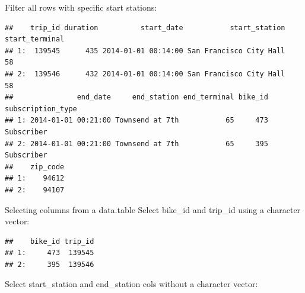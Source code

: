 \documentclass[]{book}
\newenvironment{Shaded}{\begin{snugshade}}{\end{snugshade}}
\newcommand{\DecValTok}[1]{\textcolor[rgb]{0.00,0.00,0.81}{#1}}
\newcommand{\KeywordTok}[1]{\textcolor[rgb]{0.13,0.29,0.53}{\textbf{#1}}}
\newcommand{\NormalTok}[1]{#1}
\newcommand{\OperatorTok}[1]{\textcolor[rgb]{0.81,0.36,0.00}{\textbf{#1}}}
\newcommand{\StringTok}[1]{\textcolor[rgb]{0.31,0.60,0.02}{#1}}
\begin{document}
Filter all rows with specific start stations:

\begin{Shaded}
\end{Shaded}

\begin{verbatim}
##    trip_id duration          start_date           start_station start_terminal
## 1:  139545      435 2014-01-01 00:14:00 San Francisco City Hall             58
## 2:  139546      432 2014-01-01 00:14:00 San Francisco City Hall             58
##               end_date     end_station end_terminal bike_id subscription_type
## 1: 2014-01-01 00:21:00 Townsend at 7th           65     473        Subscriber
## 2: 2014-01-01 00:21:00 Townsend at 7th           65     395        Subscriber
##    zip_code
## 1:    94612
## 2:    94107
\end{verbatim}

Selecting columns from a data.table
Select bike\_id and trip\_id using a character vector:

\begin{Shaded}
\end{Shaded}

\begin{verbatim}
##    bike_id trip_id
## 1:     473  139545
## 2:     395  139546
\end{verbatim}

Select start\_station and end\_station cols without a character vector:

\begin{Shaded}
\end{Shaded}
\end{document}
